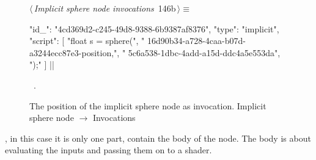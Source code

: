 \documentclass[%
    a4paper,    %
    justified,  %
    nobib,      %
    openany     %
]{tufte-book}
\makeatletter
\renewcommand{\label}[1]{\@tufte@label{##1}}%
\makeatother
\begin{document}
\begin{figure}[!htbp]
\begin{flushleft} \small
\begin{minipage}{\linewidth}\label{scrap102}\raggedright\small
{} $\langle\,${\itshape Implicit sphere node invocations}\nobreak\ {\footnotesize {146b}}$\,\rangle\equiv$
\vspace{-1ex}
\begin{pythoncode}
{
    "id_": "4cd369d2-c245-49d8-9388-6b9387af8376",
    "type": "implicit",
    "script": [
        "float s = sphere(",
        "    16d90b34-a728-4caa-b07d-a3244ecc87e3-position,",
        "    5c6a538-1dbc-4add-a15d-ddc4a5e553da",
        ");"
    ]
}|\NWsep|
\end{pythoncode}
\vspace{1.5ex}
\footnotesize
\begin{list}{}{\setlength{\itemsep}{-\parsep}\setlength{\itemindent}{-\leftmargin}}
\item \NWtxtMacroRefIn\ .

\item{}
\end{list}
\end{minipage}\vspace{4ex}
\end{flushleft}
\caption{The position of the implicit sphere node as invocation.
  \newline{}\newline{}Implicit sphere node $\rightarrow$ Invocations}
\end{figure}

, in this case it is only one part, contain
the body of the node. The body is about evaluating the inputs and passing them
on to a shader.

\end{document}
